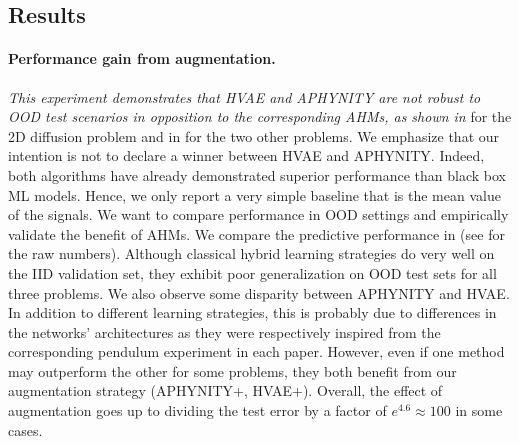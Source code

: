 \subsection{Results}
\paragraph{Performance gain from augmentation.}
\textit{This experiment demonstrates that HVAE and APHYNITY are not robust to OOD test scenarios in opposition to the corresponding AHMs, as shown in } for the 2D diffusion problem and in  for the two other problems. We emphasize that our intention is not to declare a winner between HVAE and APHYNITY. Indeed, both algorithms have already demonstrated superior performance than black box ML models. Hence, we only report a very simple baseline that is the mean value of the signals. We want to compare performance in OOD settings and empirically validate the benefit of AHMs.
We compare the predictive performance in  (see  for the raw numbers).  Although classical hybrid learning strategies do very well on the IID validation set, they exhibit poor generalization on OOD test sets for all three problems. We also observe some disparity between APHYNITY and HVAE. In addition to different learning strategies, this is probably due to differences in the networks' architectures as they were respectively inspired from the corresponding pendulum experiment in each paper. However, even if one method may outperform the other for some problems, they both benefit from our augmentation strategy (APHYNITY+, HVAE+). Overall, the effect of augmentation goes up to dividing the test error by a factor of $e^{4.6}\approx 100$ in some cases.

